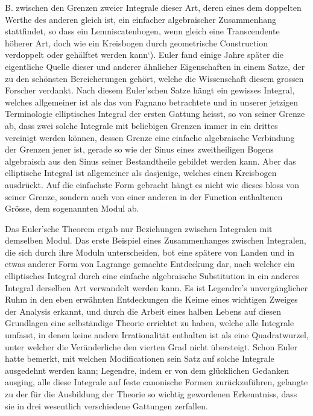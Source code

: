\documentclass[11pt]{article}
\begin{document}
B. zwischen den Grenzen zweier Integrale dieser Art, deren eines dem doppelten Werthe des anderen gleich ist, ein einfacher algebraischer Zusammenhang stattfindet, so dass ein Lemniscatenbogen, wenn gleich eine Transcendente höherer Art, doch wie ein Kreisbogen durch geometrische Construction verdoppelt oder gehälftet werden kann‘). Euler fand einige Jahre später die eigentliche Quelle dieser und anderer ähnlicher Eigenschaften in einem Satze, der zu den schönsten Bereicherungen gehört, welche die Wissenschaft diesem grossen Forscher verdankt. Nach diesem Euler’schen Satze hängt ein gewisses Integral, welches allgemeiner ist als das von Fagnano betrachtete und in unserer jetzigen Terminologie elliptisches Integral der ersten Gattung heisst, so von seiner Grenze ab, dass zwei solche Integrale mit beliebigen Grenzen immer in ein drittes vereinigt werden können, dessen Grenze eine einfache algebraische Verbindung der Grenzen jener ist, gerade so wie der Sinus eines zweitheiligen Bogens algebraisch aus den Sinus seiner Bestandtheile gebildet werden kann. Aber das elliptische Integral ist allgemeiner als dasjenige, welches einen Kreisbogen ausdrückt. Auf die einfachste Form gebracht hängt es nicht wie dieses bloss von seiner Grenze, sondern auch von einer anderen in der Function enthaltenen Grösse, dem sogenannten Modul ab.

Das Euler’sche Theorem ergab nur Beziehungen zwischen Integralen mit demselben Modul. Das erste Beispiel eines Zusammenhanges zwischen Integralen, die sich durch ihre Moduln unterscheiden, bot eine spätere von Landen und in etwas anderer Form von Lagrange gemachte Entdeckung dar, nach welcher ein elliptisches Integral durch eine einfache algebraische Substitution in ein anderes Integral derselben Art verwandelt werden kann. Es ist Legendre’s unvergänglicher Ruhm in den eben erwähnten Entdeckungen die Keime eines wichtigen Zweiges der Analysis erkannt, und durch die Arbeit eines halben Lebens auf diesen Grundlagen eine selbständige Theorie errichtet zu haben, welche alle Integrale umfasst, in denen keine andere Irrationalität enthalten ist als eine Quadratwurzel, unter welcher die Veränderliche den vierten Grad nicht übersteigt. Schon Euler hatte bemerkt, mit welchen Modificationen sein Satz auf solche Integrale ausgedehnt werden kann; Legendre, indem er von dem glücklichen Gedanken ausging, alle diese Integrale auf feste canonische Formen zurückzuführen, gelangte zu der für die Ausbildung der Theorie so wichtig gewordenen Erkenntniss, dass sie in drei wesentlich verschiedene Gattungen zerfallen.
\end{document}
